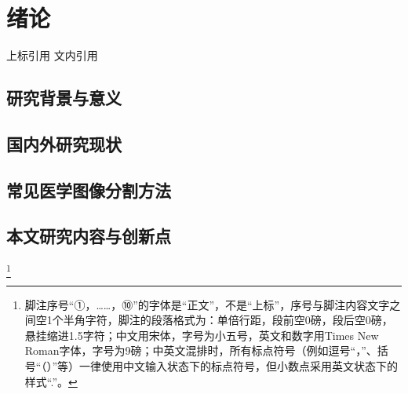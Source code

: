 
\chapter{绪论}
上标引用
文内引用\cite{itkbook1}

\section{研究背景与意义}

\section{国内外研究现状}

\section{常见医学图像分割方法}

\section{本文研究内容与创新点}




\footnote{脚注序号“①，……，⑩”的字体是“正文”，不是“上标”，序号与脚注内容文字之间空1个半角字符，脚注的段落格式为：单倍行距，段前空0磅，段后空0磅，悬挂缩进1.5字符；中文用宋体，字号为小五号，英文和数字用Times New Roman字体，字号为9磅；中英文混排时，所有标点符号（例如逗号“，”、括号“（）”等）一律使用中文输入状态下的标点符号，但小数点采用英文状态下的样式“.”。}
